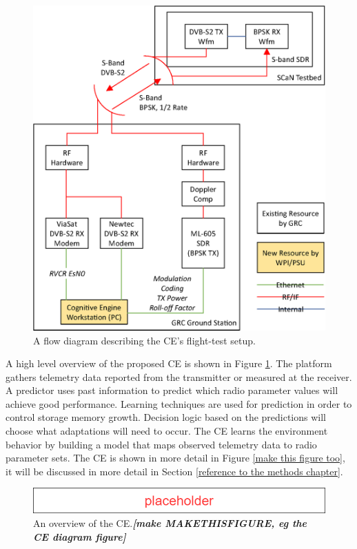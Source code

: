 	\begin{figure}
		\centering
		\caption{A flow diagram describing the CE's flight-test setup.}
		\label{fig:CE_outline}
		\includegraphics[scale=0.5]{figures/system_block_diagram.eps}
	\end{figure}
	
	\par A high level overview of the proposed CE is shown in Figure \ref{fig:CE_outline}. The platform gathers telemetry data reported from the transmitter or measured at the receiver. A predictor uses past information to predict which radio parameter values will achieve good performance. Learning techniques are used for prediction in order to control storage memory growth. Decision logic based on the predictions will choose what adaptations will need to occur. The CE learns the environment behavior by building a model that maps observed telemetry data to radio parameter sets. The CE is shown in more detail in Figure \ref{make this figure too}, it will be discussed in more detail in Section \ref{reference to the methods chapter}.
	\begin{figure}
		\centering
		\caption{An overview of the CE.\textit{\textbf{[make MAKETHISFIGURE, eg the CE diagram figure]}}}
		\label{bg:CEFigure}
		\includegraphics[scale=0.5]{figures/Placeholder.png}
	\end{figure}

